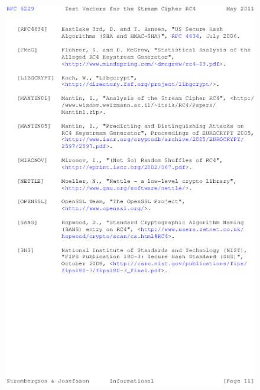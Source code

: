 \begin{anexosenv}
\begin{figure}
\centering
\includegraphics{figuras/file-10}
\end{figure}


\end{anexosenv}
